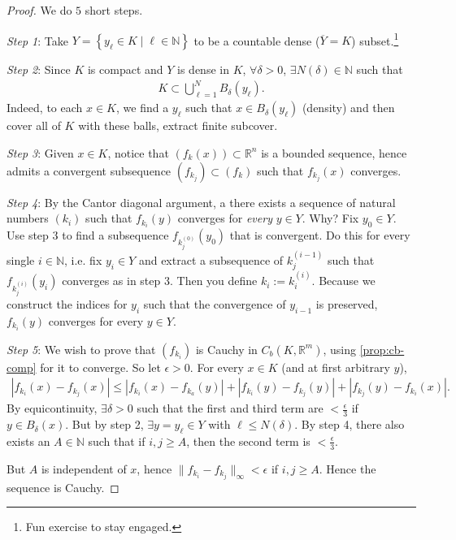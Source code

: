 \begin{proof}
    We do $5$ short steps.

    \textit{Step 1}: Take $Y = \left\{ y_{\ell} \in K \mid \ell \in \mathbb{N} \right\}$ to be a countable dense ($\overline{ Y } = K$) subset.\footnote{Fun exercise to stay engaged.} 

    \textit{Step 2}: Since $K$ is compact and $Y$ is dense in $K$, $\forall \delta > 0$, $\exists N(\delta) \in \mathbb{N}$ such that 
    \begin{align*}
        K \subset \bigcup_{\ell=1}^{N} B_{\delta}(y_{\ell}).
    \end{align*}    
    Indeed, to each $x \in K$, we find a $y_{\ell}$ such that $x \in B_{\delta}(y_{\ell})$ (density) and then cover all of $K$ with these balls, extract finite subcover.

    \textit{Step 3}: Given $x \in K$, notice that $(f_{k}(x)) \subset \mathbb{R}^{n}$ is a bounded sequence, hence admits a convergent subsequence $(f_{k_{j}}) \subset (f_{k})$ such that $f_{k_{j}}(x)$ converges.

    \textit{Step 4}: By the Cantor diagonal argument, a there exists  a sequence of natural numbers $(k_{i})$ such that $f_{k_{i}}(y)$ converges for \textit{every} $y \in Y$. Why? Fix $y_{0} \in Y$. Use step 3 to find a subsequence $f_{k_{j}^{(0)}}(y_{0})$ that is convergent. Do this for every single $i \in \mathbb{N}$, i.e. fix $y_{i} \in Y$ and extract a subsequence of $k_{j}^{(i-1)}$ such that $f_{k_{j}^{(i)}}(y_{i})$ converges as in step 3. Then you define $k_{i } := k_{i }^{(i )}$. Because we construct the indices for $y_{i}$ such that the convergence of $y_{i-1}$ is preserved, $f_{k_{i}}(y)$ converges for every $y \in Y$.
    
    \textit{Step 5}: We wish to prove that $(f_{k_{i}})$ is Cauchy in $C_{b}(K, \mathbb{R}^{m})$, using \ref{prop:cb-comp} for it to converge. So let $\epsilon > 0$. For every $x \in K$ (and at first arbitrary $y$),
    \begin{align*}
        \left| f_{k_{i}}(x) - f_{k_{j}}(x) \right| \leq \left| f_{k_{i}}(x) - f_{k_{a}}(y) \right| + \left| f_{k_{i}}(y) - f_{k_{j}}(y) \right| + \left| f_{k_{j}}(y) - f_{k_{i}}(x) \right|.
    \end{align*}
    By equicontinuity, $\exists \delta > 0$ such that the first and third term are $< \frac{\epsilon}{3}$ if $y \in B_{\delta}(x)$.
    But by step 2, $\exists y = y_{\ell} \in Y$ with $\ell \leq N(\delta)$. By step 4, there also exists an $A \in \mathbb{N}$ such that if $i,j \geq A$, then the second term is $< \frac{\epsilon}{3}$. 

    But $A$ is independent of $x$, hence $\lVert f_{k_{i}} - f_{k_{j}} \rVert_{\infty} < \epsilon$ if $i,j \geq A$. Hence the sequence is Cauchy. 
\end{proof}

